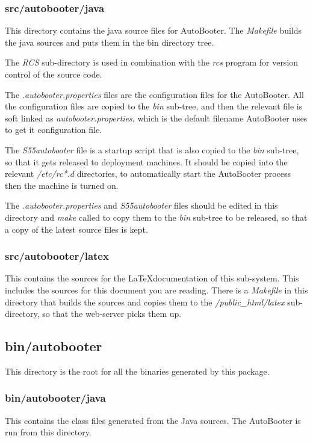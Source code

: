 \documentclass[10pt,a4paper]{article}
\begin{document}
\subsubsection{src/autobooter/java}
This directory contains the java source files for AutoBooter. The {\em Makefile} builds the
java sources and puts them in the bin directory tree. 

The {\em RCS} sub-directory is used 
in combination with the {\em rcs} program for version control of the source code.

The {\em *.autobooter.properties} files are the configuration files for the AutoBooter.
All the configuration files are copied to the {\em bin} sub-tree, and then the relevant 
file is soft linked as {\em autobooter.properties}, which is the default filename AutoBooter
uses to get it configuration file.

The {\em S55autobooter} file is a startup script that is also copied to the {\em bin}
sub-tree, so that it gets released to deployment machines. It should be copied into the
relevant {\em /etc/rc*.d} directories, to automatically start the AutoBooter process
then the machine is turned on.

The {\em *.autobooter.properties} and {\em S55autobooter} files should be edited in this directory
and {\em make} called to copy them to the {\em bin} sub-tree to be released, so that a copy of the
latest source files is kept.

\subsubsection{src/autobooter/latex}
This contains the sources for the \LaTeX documentation of this sub-system. This includes the
sources for this document you are reading. There is a {\em Makefile} in this directory that builds the
sources and copies them to the {\em /public\_html/latex} sub-directory, so that the web-server picks them up.

\subsection{bin/autobooter}
This directory is the root for all the binaries generated by this package.

\subsubsection{bin/autobooter/java}
This contains the class files generated from the Java sources. The AutoBooter is run from this directory.
\end{document}
